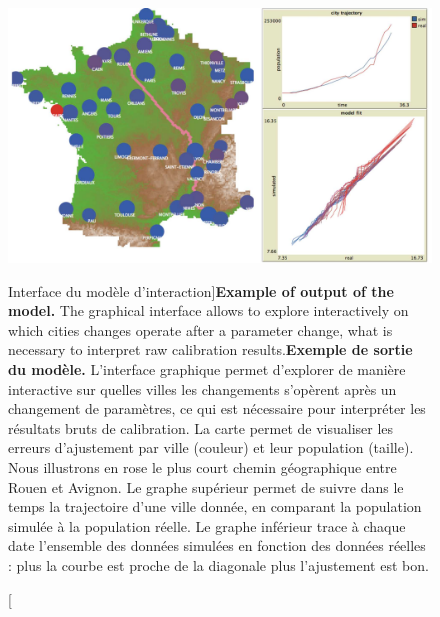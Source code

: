 \begin{figure}
\includegraphics[width=\linewidth]{Figures/Final/4-3-2-fig-interactiongibrat-interface}
\caption[Model output][Interface du modèle d'interaction]{\textbf{Example of output of the model.} The graphical interface allows to explore interactively on which cities changes operate after a parameter change, what is necessary to interpret raw calibration results.\label{fig:interactiongibrat:interface}}{\textbf{Exemple de sortie du modèle.} L'interface graphique permet d'explorer de manière interactive sur quelles villes les changements s'opèrent après un changement de paramètres, ce qui est nécessaire pour interpréter les résultats bruts de calibration. La carte permet de visualiser les erreurs d'ajustement par ville (couleur) et leur population (taille). Nous illustrons en rose le plus court chemin géographique entre Rouen et Avignon. Le graphe supérieur permet de suivre dans le temps la trajectoire d'une ville donnée, en comparant la population simulée à la population réelle. Le graphe inférieur trace à chaque date l'ensemble des données simulées en fonction des données réelles : plus la courbe est proche de la diagonale plus l'ajustement est bon.\label{fig:interactiongibrat:interface}}
\end{figure}



